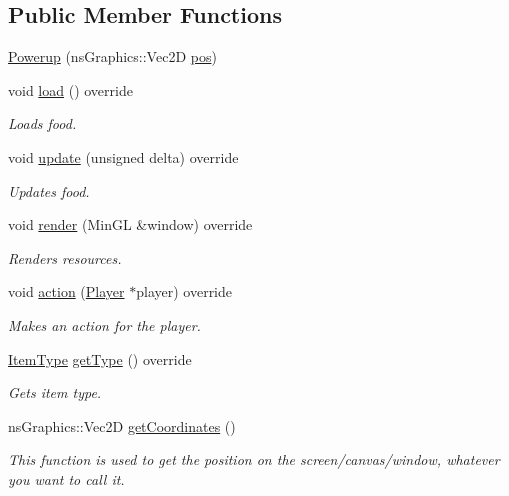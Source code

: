 \subsection*{Public Member Functions}
\begin{DoxyCompactItemize}
\item 
\hyperlink{classns_game_1_1_powerup_a63e512471f199b9a4830785398f09378}{Powerup} (ns\+Graphics\+::\+Vec2D \hyperlink{structns_game_1_1_item_a5518876a13f3d2eda659d29748097f1a}{pos})
\item 
void \hyperlink{classns_game_1_1_powerup_a2a228e8f89bed454ad8011dfd88068c6}{load} () override
\begin{DoxyCompactList}\small\item\em Loads food. \end{DoxyCompactList}\item 
void \hyperlink{classns_game_1_1_powerup_a0f86905ba37cc0a4e80827db0563cfa3}{update} (unsigned delta) override
\begin{DoxyCompactList}\small\item\em Updates food. \end{DoxyCompactList}\item 
void \hyperlink{classns_game_1_1_powerup_ad113cfd795157168c103b71560180201}{render} (Min\+GL \&window) override
\begin{DoxyCompactList}\small\item\em Renders resources. \end{DoxyCompactList}\item 
void \hyperlink{classns_game_1_1_powerup_af307aba7b61132f2dc037d8ef62581f9}{action} (\hyperlink{classns_game_1_1_player}{Player} $\ast$player) override
\begin{DoxyCompactList}\small\item\em Makes an action for the player. \end{DoxyCompactList}\item 
\hyperlink{namespacens_game_a5f7db01e6447720e9a145f0b3c68a4d7}{Item\+Type} \hyperlink{classns_game_1_1_powerup_a34f105d75a90ddbbc6afa46c83bdccf6}{get\+Type} () override
\begin{DoxyCompactList}\small\item\em Gets item type. \end{DoxyCompactList}\item 
ns\+Graphics\+::\+Vec2D \hyperlink{classns_game_1_1_powerup_a31700271cd7bd2040d26bcac7f437408}{get\+Coordinates} ()
\begin{DoxyCompactList}\small\item\em This function is used to get the position on the screen/canvas/window, whatever you want to call it. \end{DoxyCompactList}\end{DoxyCompactItemize}
